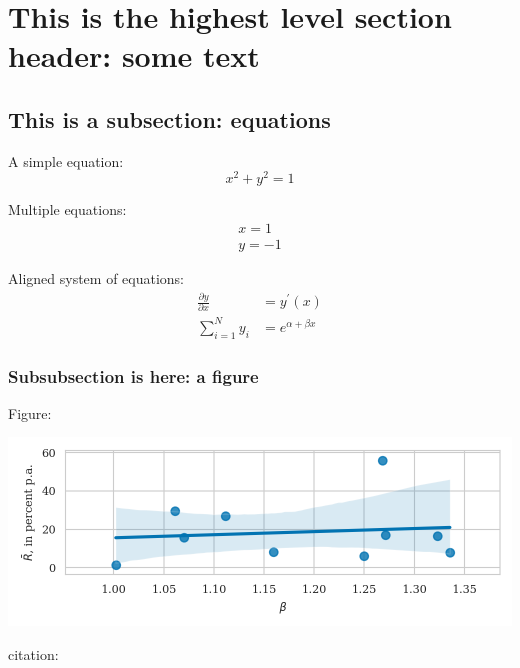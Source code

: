 \documentclass{article}
\begin{document}
\section{This is the highest level section header: some text}
\blindtext[1]

\subsection{This is a subsection: equations}

A simple equation:
\begin{equation}
x^2 + y^2 = 1
\end{equation}


Multiple equations:
\begin{gather}
	x = 1 \\
	y = -1
\end{gather}



Aligned system of equations:
\begin{align}
\frac{\partial y}{\partial x} &= y ^ {\prime} (x) \\
\sum\limits_{i=1}^{N}y_i &= e^{\alpha + \beta x}
\end{align}

\subsubsection{Subsubsection is here: a figure}
Figure:

\includegraphics{../../figures/beta-vs-mu.png}

citation:
\cite{Cieslak2019}

\printbibliography
\end{document}
